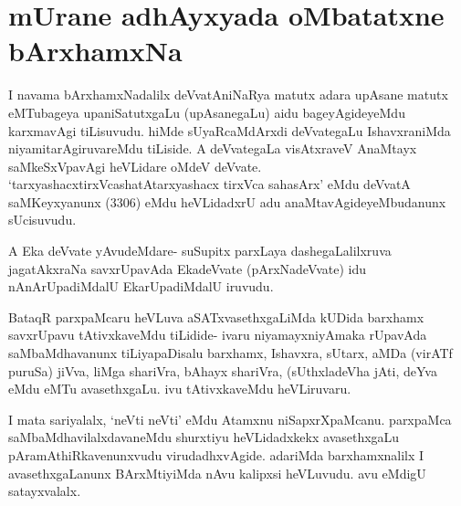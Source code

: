 \begin{center}
\end{center}



\section*{mUrane adhAyxyada oMbatatxne bArxhamxNa}

\begin{artha}
I navama bArxhamxNadalilx deVvatAniNaRya matutx adara upAsane matutx eMTubageya upaniSatutxgaLu (upAsanegaLu) aidu bageyAgideyeMdu karxmavAgi tiLisuvudu. hiMde sUyaRcaMdArxdi deVvategaLu IshavxraniMda niyamitarAgiruvareMdu tiLiside. A deVvategaLa visAtxraveV AnaMtayx saMkeSxVpavAgi heVLidare oMdeV deVvate. `tarxyashacxtirxVcashatAtarxyashacx tirxVca sahasArx' eMdu deVvatA saMKeyxyanunx (3306) eMdu heVLidadxrU adu anaMtavAgideyeMbudanunx sUcisuvudu. 
\end{artha}

\begin{artha}
A Eka deVvate yAvudeMdare- suSupitx parxLaya dashegaLalilxruva jagatAkxraNa savxrUpavAda EkadeVvate (pArxNadeVvate) idu nAnArUpadiMdalU EkarUpadiMdalU iruvudu. 
\end{artha}


\begin{artha}
BataqR parxpaMcaru heVLuva aSATxvasethxgaLiMda kUDida barxhamx savxrUpavu tAtivxkaveMdu tiLidide- ivaru niyamayxniyAmaka rUpavAda saMbaMdhavanunx tiLiyapaDisalu barxhamx, Ishavxra, sUtarx, aMDa (virATf puruSa) jiVva, liMga shariVra, bAhayx shariVra, (sUthxladeVha jAti, deYva eMdu eMTu avasethxgaLu. ivu tAtivxkaveMdu heVLiruvaru.
\end{artha}


\begin{artha}
I mata sariyalalx, `neVti neVti' eMdu Atamxnu niSapxrXpaMcanu. parxpaMca saMbaMdhavilalxdavaneMdu shurxtiyu heVLidadxkekx avasethxgaLu pAramAthiRkavenunxvudu virudadhxvAgide. adariMda barxhamxnalilx I avasethxgaLanunx BArxMtiyiMda nAvu kalipxsi heVLuvudu. avu eMdigU satayxvalalx. 
\end{artha}

